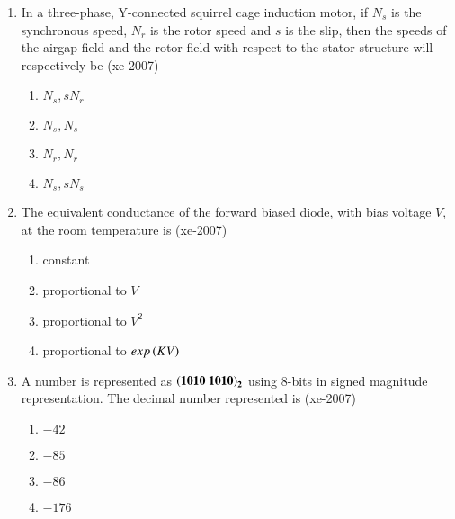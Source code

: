 \documentclass[journal,12pt,onecolumn]{IEEEtran}
\theoremstyle{remark}
\begin{document}
\begin{enumerate}
\begin{center}
\begin{circuitikz}[american]
    	\end{circuitikz}
    \end{center}
    \begin{multicols}{4}
    \begin{enumerate}
    \item $0.67\angle 0 \degree$
    \item $2.0\angle 0 \degree$
    \item $2.67\angle 0 \degree$
    \item $10.67\angle 0 \degree$
    \end{enumerate}
	\end{multicols}
    \item In a three-phase, Y-connected squirrel cage induction motor, if $N_s$ is the synchronous speed, $N_r$ is the rotor speed and $s$ is the slip, then the speeds of the airgap field and the rotor field with respect to the stator structure will respectively be
    \hfill{(xe-2007)}
    \begin{multicols}{4}
    \begin{enumerate}
    \item $N_s, sN_r$
    \item $N_s, N_s$
    \item $N_r, N_r$
    \item $N_s, sN_s$
    \end{enumerate}
    \end{multicols}
    \item The equivalent conductance of the forward biased diode, with bias voltage $V$, at the room temperature is
    \hfill{(xe-2007)}
    \begin{enumerate}
    \item constant
    \item proportional to $V$
    \item proportional to $V^{2}$
    \item proportional to $exp\left(KV\right)$
    \end{enumerate}
    \item A number is represented as $\mathbf{\left(1010\text{ }1010\right)_2}$ using 8-bits in signed magnitude representation. The decimal number represented is
    \hfill{(xe-2007)}
    \begin{multicols}{4}
    \begin{enumerate}
    \item $-42$
    \item $-85$
    \item $-86$
    \item $-176$

\end{enumerate}
\end{multicols}
\end{enumerate}
\end{document}
